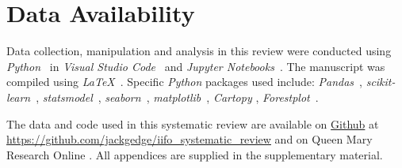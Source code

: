 \section*{Data Availability}
\noindent Data collection, manipulation and analysis in this review were conducted using \textit{Python}~\cite{PythonSoftwareFoundation_2025} in \textit{Visual Studio Code}~\cite{Microsoft_2025} and \textit{Jupyter Notebooks}~\cite{Kluyver_2016}. The manuscript was compiled using \textit{LaTeX}~\cite{Lamport_1984}. Specific \textit{Python} packages used include: \textit{Pandas}~\cite{ThePandasDevelopmentTeam_2020}, \textit{scikit-learn}~\cite{Pedregosa_2011}, \textit{statsmodel}~\cite{Seabold_2010}, \textit{seaborn}~\cite{Waskom_2021}, \textit{matplotlib}~\cite{Hunter_2007a}, \textit{Cartopy} \cite{MetOffice_2010}, \textit{Forestplot}~\cite{Shen_2022}.

The data and code used in this systematic review are available on \href{https://github.com/jackgedge/iifo\_systematic\_review}{Github} at \url{https://github.com/jackgedge/iifo\_systematic\_review} and on Queen Mary Research Online \cite{Galbraith-Edge_2025}. All appendices are supplied in the supplementary material.